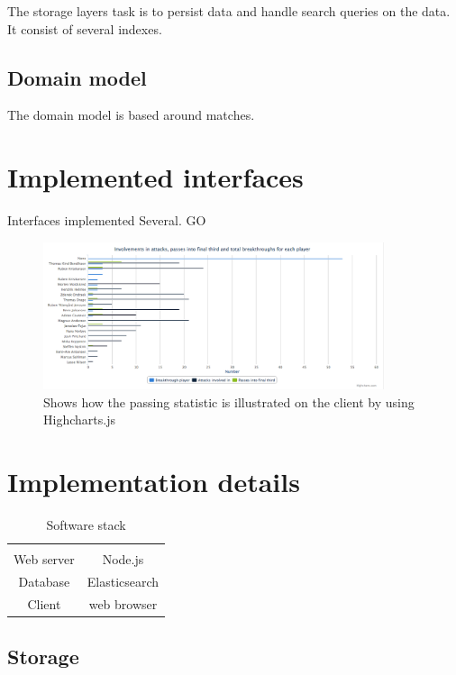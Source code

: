 The storage layers task is to persist data and handle search queries on the data. It consist of several indexes. 

\subsection{Domain model}

The domain model is based around matches.



\section{Implemented interfaces}

Interfaces implemented Several. GO

\begin{figure}[ht!]
\centering
\includegraphics[width=100mm]{images/general/chart_passes.png}
\caption{Shows how the passing statistic is illustrated on the client by using Highcharts.js}
\label{overflow}
\end{figure}

\section{Implementation details}

\begin{table}[ht]
\caption{Software stack}
\begin{center}
\begin{tabular}{c|c}
    \hline
    \multicolumn{2}{c}{}\\
    Web server& Node.js\\
    Database& Elasticsearch\\
    Client & web  browser \\
\hline
\end{tabular}
\end{center}
\label{tab:multicol}
\end{table}


\subsection{Storage}

